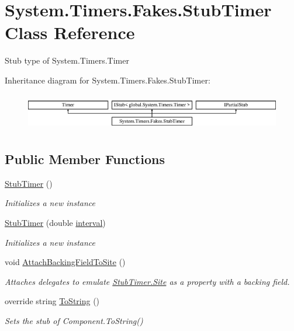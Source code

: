 \hypertarget{class_system_1_1_timers_1_1_fakes_1_1_stub_timer}{\section{System.\-Timers.\-Fakes.\-Stub\-Timer Class Reference}
\label{class_system_1_1_timers_1_1_fakes_1_1_stub_timer}
}


Stub type of System.\-Timers.\-Timer 


Inheritance diagram for System.\-Timers.\-Fakes.\-Stub\-Timer\-:\begin{figure}[H]
\begin{center}
\leavevmode
\includegraphics[height=1.651917cm]{class_system_1_1_timers_1_1_fakes_1_1_stub_timer}
\end{center}
\end{figure}
\subsection*{Public Member Functions}
\begin{DoxyCompactItemize}
\item 
\hyperlink{class_system_1_1_timers_1_1_fakes_1_1_stub_timer_a0e97759ce2b82d0dcab1cdfc9c0925ce}{Stub\-Timer} ()
\begin{DoxyCompactList}\small\item\em Initializes a new instance\end{DoxyCompactList}\item 
\hyperlink{class_system_1_1_timers_1_1_fakes_1_1_stub_timer_a4fd4e6c6f92443d72a52383cb61cf238}{Stub\-Timer} (double \hyperlink{jquery-1_810_82_8js_a22f2d1dcf51c862e922248df75aaa9f7}{interval})
\begin{DoxyCompactList}\small\item\em Initializes a new instance\end{DoxyCompactList}\item 
void \hyperlink{class_system_1_1_timers_1_1_fakes_1_1_stub_timer_ad6d878fc93a874695ec01e5c23865319}{Attach\-Backing\-Field\-To\-Site} ()
\begin{DoxyCompactList}\small\item\em Attaches delegates to emulate \hyperlink{class_system_1_1_timers_1_1_fakes_1_1_stub_timer_a4cccf4f3aba8efcf73f470b0b8a76da0}{Stub\-Timer.\-Site} as a property with a backing field.\end{DoxyCompactList}\item 
override string \hyperlink{class_system_1_1_timers_1_1_fakes_1_1_stub_timer_af65b2a5e71f53c3e7dfdaedc32152eff}{To\-String} ()
\begin{DoxyCompactList}\small\item\em Sets the stub of Component.\-To\-String()\end{DoxyCompactList}\end{DoxyCompactItemize}
